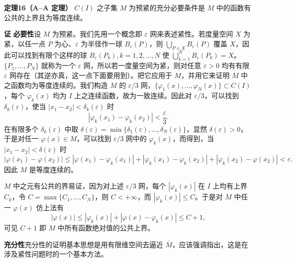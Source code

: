 \noindent\textbf{定理16（A--A 定理）}\quad
$C(I)$ 之子集 $M$ 为预紧的充分必要条件是 $M$ 中的函数有公共的上界且为等度连续。

\noindent\textbf{证}\quad
\textbf{必要性}\quad 设 $M$ 为预紧。我们先用一个概念即 $\varepsilon$ 网来表述紧性。若度量空间 $X$ 为紧，以任一点 $P$ 为心、$\varepsilon$ 为半径作一球 $B_\varepsilon(P)$，则 $\bigcup_{P\in X}B_\varepsilon(P)$ 覆盖 $X$，因此可以找到有限个这样的球 $B_\varepsilon(P_k),k=1,2,\ldots,N$ 使 $\bigcup_{k=1}^N B_\varepsilon(P_k)=X$。$\{P_1,\ldots,P_N\}$ 就称为一个 $\varepsilon$ 网，所以若一度量空间为紧，则对任意 $\varepsilon>0$ 均有有限 $\varepsilon$ 网存在（其逆亦真，这一点下面要用到）。把它应用于 $M$，并用它来证明 $M$ 中之函数均为等度连续的。我们构造 $M$ 的 $\varepsilon/3$ 网，$\{\varphi_1(x),\ldots,\varphi_N(x)\}\subset C(I)$，每个 $\varphi_k(x)$ 均为 $I$ 上之连续函数，故为一致连续。因此对 $\varepsilon/3$，可以找到 $\delta_k(\varepsilon)$，使当 $|x_1-x_2|<\delta_k(\varepsilon)$ 时
\[
 |\varphi_k(x_1)-\varphi_k(x_2)|<\frac{\varepsilon}{3}.
\]
在有限多个 $\delta_k(\varepsilon)$ 中取 $\delta(\varepsilon)=\min\{\delta_1(\varepsilon),\ldots,\delta_N(\varepsilon)\}$，显然 $\delta(\varepsilon)>0$，于是对任一 $\varphi(x)\in M$，可以找到 $\varepsilon/3$ 网中的 $\varphi_k(x)$，而得到，当 $|x_1-x_2|<\delta(\varepsilon)$ 时
\[
 |\varphi(x_1)-\varphi(x_2)|
 \le |\varphi(x_1)-\varphi_k(x_1)|+|\varphi_k(x_1)-\varphi_k(x_2)|+|\varphi_k(x_2)-\varphi(x_2)|
 <\varepsilon.
\]
因此 $M$ 是等度连续的。

$M$ 中之元有公共的界易证，因为对上述 $\varepsilon/3$ 网，每个 $|\varphi_k(x)|$ 在 $I$ 上均有上界 $C_k$，令 $C=\max\{C_1,\ldots,C_N\}$，则 $C<+\infty$，而 $|\varphi_k(x)|\le C$。于是对 $M$ 中任一 $\varphi(x)$ 仿上法有
\[
 |\varphi(x)|\le |\varphi_k(x)|+|\varphi(x)-\varphi_k(x)|\le C+1,
\]
可见 $C+1$ 即 $M$ 中所有函数绝对值的公共上界。

\textbf{充分性}\quad 充分性的证明基本思想是用有限维空间去逼近 $\overline M$，应该强调指出，这是在涉及紧性问题时的一个基本方法。


